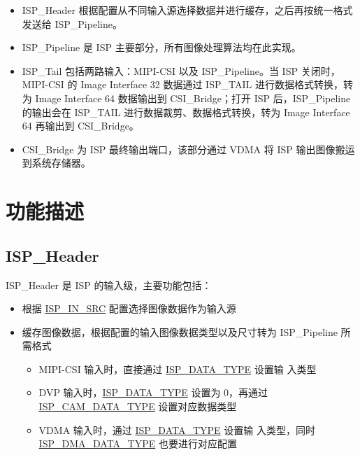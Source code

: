 \documentclass[main\_\_CN.tex]{subfiles}
\begin{document}
\begin{itemize}
    \item ISP\_Header 根据配置从不同输入源选择数据并进行缓存，之后再按统一格式发送给 ISP\_Pipeline。
    \item ISP\_Pipeline 是 ISP 主要部分，所有图像处理算法均在此实现。
    \item ISP\_Tail 包括两路输入：MIPI-CSI 以及 ISP\_Pipeline。当 ISP 关闭时，MIPI-CSI 的 Image Interface 32 数据通过 ISP\_TAIL 进行数据格式转换，转为 Image Interface 64 数据输出到 CSI\_Bridge；打开 ISP 后，ISP\_Pipeline 的输出会在 ISP\_TAIL 进行数据裁剪、数据格式转换，转为 Image Interface 64 再输出到 CSI\_Bridge。
    \item CSI\_Bridge 为 ISP 最终输出端口，该部分通过 VDMA 将 ISP 输出图像搬运到系统存储器。
\end{itemize}



\section{功能描述}
\label{sec:isp-func-descr}

\subsection{ISP\_Header}
ISP\_Header 是 ISP 的输入级，主要功能包括：

\begin{itemize}
    \item 根据 \hyperref[fielddesc:ISPINSRC]{ISP\_IN\_SRC} 配置选择图像数据作为输入源
    \item 缓存图像数据，根据配置的输入图像数据类型以及尺寸转为 ISP\_Pipeline 所需格式
    \begin{itemize}
        \item MIPI-CSI 输入时，直接通过 \hyperref[fielddesc:ISPDATATYPE]{ISP\_DATA\_TYPE} 设置输
        入类型
        \item DVP 输入时，\hyperref[fielddesc:ISPDATATYPE]{ISP\_DATA\_TYPE} 设置为 0，再通过 \hyperref[fielddesc:ISPCAMDATATYPE]{ISP\_CAM\_DATA\_TYPE} 设置对应数据类型
        \item VDMA 输入时，通过 \hyperref[fielddesc:ISPDATATYPE]{ISP\_DATA\_TYPE} 设置输
        入类型，同时 \hyperref[fielddesc:ISPDMADATATYPE]{ISP\_DMA\_DATA\_TYPE} 也要进行对应配置
    \end{itemize}
\end{itemize}
\end{document}
